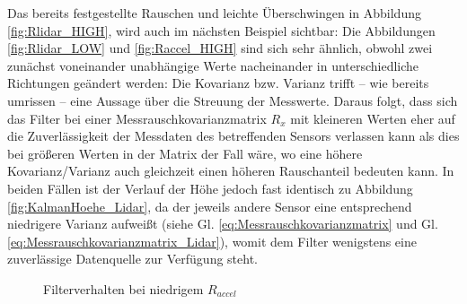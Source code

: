 \documentclass[12pt,a4paper]{article}
\begin{document}
\begin{enumerate}[label=\textbf{\arabic*})]
\begin{enumerate}[label=\textbf{\alph*})]
		Das bereits festgestellte Rauschen und leichte Überschwingen in Abbildung \ref{fig:Rlidar_HIGH}, wird auch im nächsten Beispiel sichtbar: Die Abbildungen \ref{fig:Rlidar_LOW} und \ref{fig:Raccel_HIGH} sind sich sehr ähnlich, obwohl zwei zunächst voneinander unabhängige Werte nacheinander in unterschiedliche Richtungen geändert werden: Die Kovarianz bzw. Varianz trifft -- wie bereits umrissen -- eine Aussage über die Streuung der Messwerte. Daraus folgt, dass sich das Filter bei einer Messrauschkovarianzmatrix $R_{x}$ mit kleineren Werten eher auf die Zuverlässigkeit der Messdaten des betreffenden Sensors verlassen kann als dies bei größeren Werten in der Matrix der Fall wäre, wo eine höhere Kovarianz/Varianz auch gleichzeit einen höheren Rauschanteil bedeuten kann. In beiden Fällen ist der Verlauf der Höhe jedoch fast identisch zu Abbildung \ref{fig:KalmanHoehe_Lidar}, da der jeweils andere Sensor eine entsprechend niedrigere Varianz aufweißt (siehe Gl. \ref{eq:Messrauschkovarianzmatrix} und Gl. \ref{eq:Messrauschkovarianzmatrix_Lidar}), womit dem Filter wenigstens eine zuverlässige Datenquelle zur Verfügung steht.\\
		\begin{figure}[!ht]
			\hfill	
			\caption{Filterverhalten bei niedrigem $R_{accel}$}
			\label{fig:Raccel_LOW}
		\end{figure}
		

\end{enumerate}
\end{enumerate}
\end{document}

